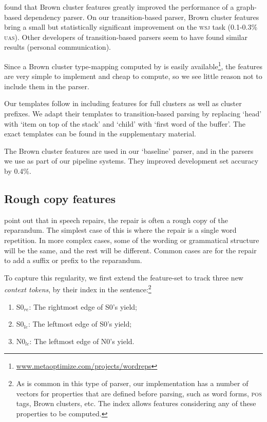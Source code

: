 \documentclass[11pt,letterpaper]{article}
\newcommand{\szero}{S0\xspace}
\newcommand{\nzero}{N0\xspace}
\newcommand{\szeroRedge}{S0$_{re}$\xspace}
\newcommand{\szeroLedge}{S0$_{le}$\xspace}
\newcommand{\nzeroLedge}{N0$_{le}$\xspace}
\begin{document}
\citet{koo:10} found that Brown cluster features greatly improved the performance
of a graph-based dependency parser. On our transition-based parser, Brown cluster
features bring a small but statistically significant improvement on the \textsc{wsj}
task (0.1-0.3\% \textsc{uas}).  Other developers of transition-based parsers
seem to have found similar results (personal communication).

Since a Brown cluster type-mapping computed by \citet{liang:05} is easily
available\footnote{\url{www.metaoptimize.com/projects/wordreps}}, the features
are very simple to implement and cheap to compute, so we see little reason not to include them
in the parser.

Our templates follow \citet{koo:10} in including features for full clusters as
well as cluster prefixes. We adapt their templates to transition-based parsing
by replacing `head' with `item on top of the stack' and `child' with `first word
of the buffer'. The exact templates can be found in the supplementary material.

The Brown cluster features are used in our `baseline' parser, and in the parsers
we use as part of our pipeline systems. They improved development set accuracy
by 0.4\%.

\subsection{Rough copy features}

\citet{Johnson04a} point out that in speech repairs, the repair is often a rough
copy of the reparandum.  The simplest case of this is where the repair is a single
word repetition. In more complex cases, some of the wording or grammatical
structure will be the same, and the rest will be different.  Common cases
are for the repair to add a suffix or prefix to the reparandum.

To capture this regularity, we first extend the feature-set to track three new
\emph{context tokens}, by their index in the sentence:\footnote{As is common
in this type of parser, our implementation has a number of vectors for properties
that are defined before parsing, such as word forms, \textsc{pos} tags, Brown
clusters, etc. The index allows features considering any of these
properties to be computed.}
\begin{enumerate}
    \itemsep0em
    \item \szeroRedge : The rightmost edge of \szero 's yield;
    \item \szeroLedge : The leftmost edge of \szero 's yield;
    \item \nzeroLedge : The leftmost edge of \nzero 's yield.
\end{enumerate}
\end{document}
